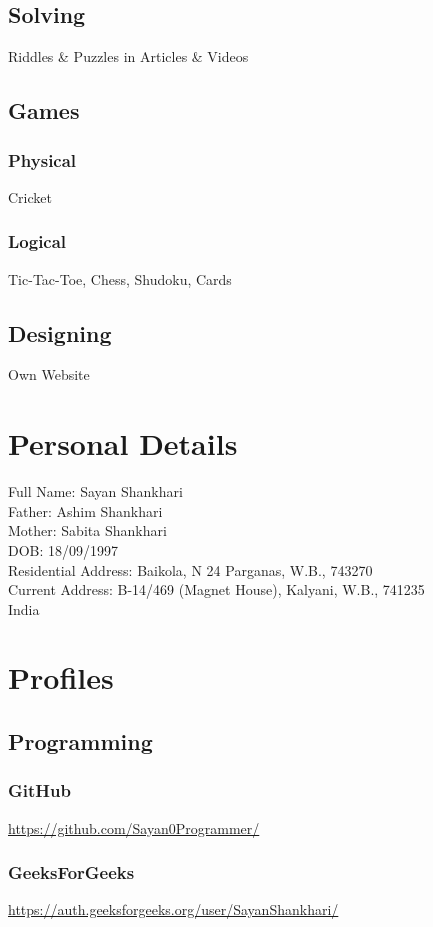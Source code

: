 \documentclass{article}
\begin{document}
\subsection{Solving}
Riddles \& Puzzles in Articles \& Videos
\subsection{Games}
\subsubsection{Physical} Cricket
\subsubsection{Logical} Tic-Tac-Toe, Chess, Shudoku, Cards
\subsection{Designing} Own Website

\section{Personal Details}
Full Name: Sayan Shankhari\\
Father: Ashim Shankhari\\
Mother: Sabita Shankhari\\
DOB: 18/09/1997\\
Residential Address: Baikola, N 24 Parganas, W.B., 743270\\
Current Address: B-14/469 (Magnet House), Kalyani, W.B., 741235\\
India\\

\section{Profiles}
\subsection{Programming}
\subsubsection{GitHub}
\url{https://github.com/Sayan0Programmer/}
\subsubsection{GeeksForGeeks}
\url{https://auth.geeksforgeeks.org/user/SayanShankhari/}
\end{document}

